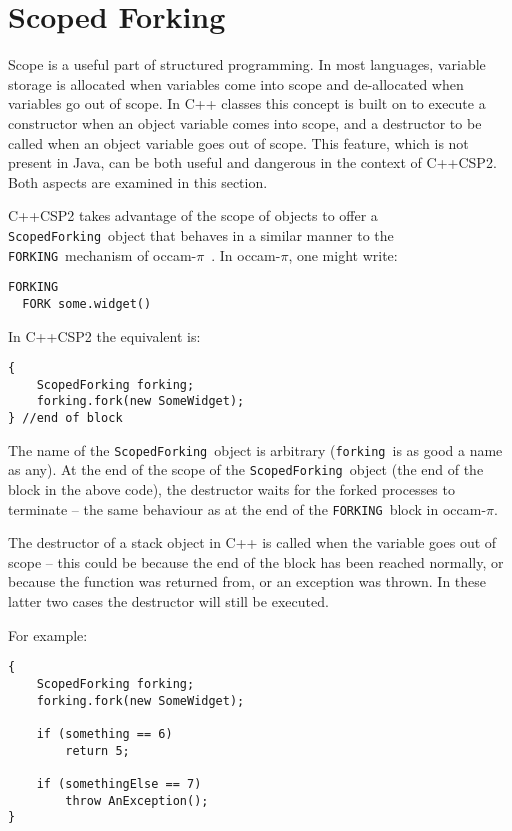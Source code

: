 \documentclass[12pt]{IOS-Book-Article-CPA-2007}
\newcommand{\occampi}{occam-$\pi$}
\newcommand{\code}[1]{{\small\texttt{#1}}}
\begin{document}
\section{Scoped Forking}

\label{sec-scope}

Scope is a useful part of structured programming.  In most languages, variable storage is allocated when variables come into scope and de-allocated when variables go out 
of scope.  In C++ classes this concept is built on to execute a constructor when an object variable comes into scope, and a destructor to be called when an 
object variable goes out of scope.  This feature, which is not present in Java, can be both useful and dangerous in the context of C++CSP2.  Both aspects are 
examined in this section.

C++CSP2 takes advantage of the scope of objects to offer a \code{ScopedForking}~object that behaves in a similar manner to the 
\code{FORKING}~mechanism of \occampi~\cite{barnes-pdcp1-02}.  In \occampi, one might write:

{\small\begin{verbatim}
FORKING
  FORK some.widget()
\end{verbatim}}

In C++CSP2 the equivalent is:

{\small\begin{verbatim}
{
    ScopedForking forking;
    forking.fork(new SomeWidget);
} //end of block
\end{verbatim}}

The name of the \code{ScopedForking}~object is arbitrary (\code{forking}~is as good a name as any).  At the end of the scope of the 
\code{ScopedForking}~object (the end of the block in the above code), the destructor waits for the forked processes to terminate -- the same behaviour as at the end of the 
\code{FORKING}~block in \occampi.  

The destructor of a stack object in C++ is called when the variable goes out of scope -- this could be because the 
end of the block has been reached normally, or because the function was returned from, or an exception was thrown.  In these latter two cases the 
destructor will still be executed.  

For example:

\newpage

{\small\begin{verbatim}
{
    ScopedForking forking;
    forking.fork(new SomeWidget);
    
    if (something == 6)
        return 5;
    
    if (somethingElse == 7)
        throw AnException();    
}
\end{verbatim}}
\end{document}

